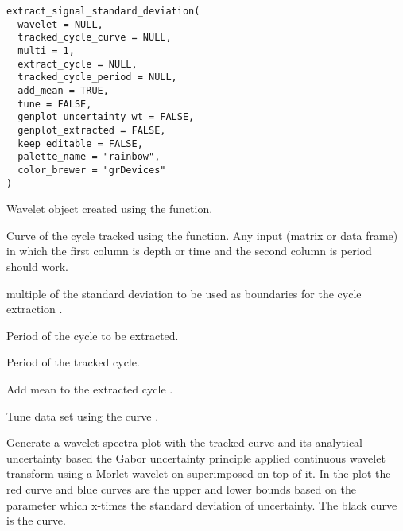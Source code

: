 \documentclass[a4paper]{book}
\begin{document}
%
\begin{Usage}
\begin{verbatim}
extract_signal_standard_deviation(
  wavelet = NULL,
  tracked_cycle_curve = NULL,
  multi = 1,
  extract_cycle = NULL,
  tracked_cycle_period = NULL,
  add_mean = TRUE,
  tune = FALSE,
  genplot_uncertainty_wt = FALSE,
  genplot_extracted = FALSE,
  keep_editable = FALSE,
  palette_name = "rainbow",
  color_brewer = "grDevices"
)
\end{verbatim}
\end{Usage}
%
\begin{Arguments}
\begin{ldescription}
\item[\code{wavelet}] Wavelet object created using the  function.

\item[\code{tracked\_cycle\_curve}] Curve of the cycle tracked using the
 function. Any input (matrix or data frame)
in which the first column is depth or time and the second column is period should work.

\item[\code{multi}] multiple of the standard deviation to be used as boundaries for the cycle extraction
.

\item[\code{extract\_cycle}] Period of the cycle to be extracted.

\item[\code{tracked\_cycle\_period}] Period of the tracked cycle.

\item[\code{add\_mean}] Add mean to the extracted cycle .

\item[\code{tune}] Tune data set using the  curve .

\item[\code{genplot\_uncertainty\_wt}] Generate a wavelet spectra plot with the tracked curve and its
analytical uncertainty based the Gabor uncertainty principle applied
continuous wavelet transform using a Morlet wavelet on superimposed on top of it.
In the plot the red curve and blue curves are the upper and lower bounds
based on the  parameter which x-times the standard deviation of uncertainty.
The black curve is the  curve.


\end{ldescription}
\end{Arguments}
\end{document}
